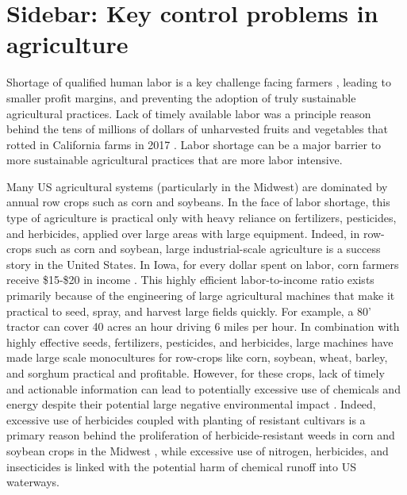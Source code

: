 \section[How can control engineers help agriculture]{Sidebar: Key control problems in agriculture}\label{sb:ag}


Shortage of qualified human labor is a key challenge facing farmers \cite{richards2018immigration,hertz2013there}, leading to smaller profit margins, and preventing the adoption of truly sustainable agricultural practices. Lack of timely available labor was a principle reason behind the tens of millions of dollars of unharvested fruits and vegetables that rotted in California farms in 2017 \cite{guthman2017paradoxes,RN4026}.  Labor shortage can be a major barrier to more sustainable agricultural practices that are more labor intensive.

Many US agricultural systems (particularly in the Midwest) are dominated by annual row crops such as corn and soybeans. In the face of labor shortage, this type of agriculture is practical only with heavy reliance on fertilizers, pesticides, and herbicides, applied over large areas with large equipment. Indeed, in row-crops such as corn and soybean, large industrial-scale agriculture is a success story in the United States. In Iowa, for every dollar spent on labor, corn farmers receive \$15-\$20 in income \cite{plastina2018estimated}.  This highly efficient labor-to-income ratio exists primarily because of the engineering of large agricultural machines that make it practical to seed, spray, and harvest large fields quickly. For example, a 80' tractor can cover 40 acres an hour driving 6 miles per hour. In combination with highly effective seeds, fertilizers, pesticides, and herbicides, large machines have made large scale monocultures for row-crops like corn, soybean, wheat, barley, and sorghum practical and profitable. However, for these crops, lack of timely and actionable information can lead to potentially excessive use of chemicals and energy despite their potential large negative environmental impact \cite{capellesso2016economic,foley2011solutions,Godfray2010Food}. Indeed, excessive use of herbicides coupled with planting of resistant cultivars is a primary reason behind the proliferation of herbicide-resistant weeds in corn and soybean crops in the Midwest \cite{heap2016web,livingston2016economic,gianessi2007value}, while excessive use of nitrogen, herbicides, and insecticides is linked with the potential harm of chemical runoff into US waterways.

